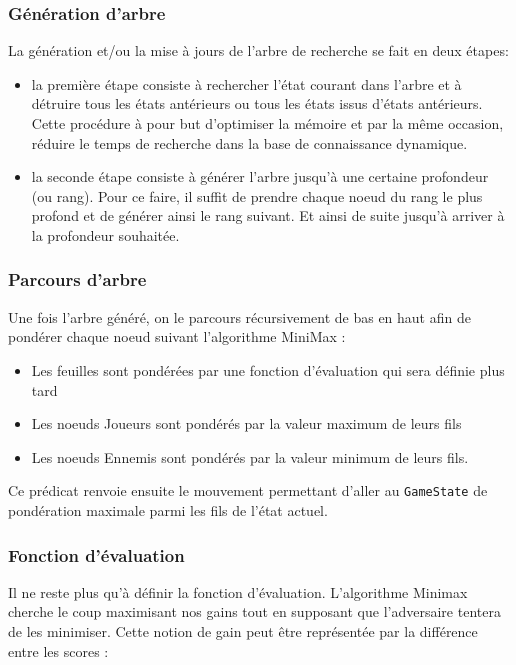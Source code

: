 \documentclass[]{article}
\begin{document}
\subsubsection{Génération d'arbre}

La génération et/ou la mise à jours de l'arbre de recherche se fait en deux étapes:
\begin{itemize}
\item la première étape consiste à rechercher l'état courant dans l'arbre et à détruire tous les états antérieurs ou tous les états issus d'états antérieurs. Cette procédure à pour but d'optimiser la mémoire et par la même occasion, réduire le temps de recherche dans la base de connaissance dynamique.
\item la seconde étape consiste à générer l'arbre jusqu'à une certaine profondeur (ou rang). Pour ce faire, il suffit de prendre chaque noeud du rang le plus profond et de générer ainsi le rang suivant. Et ainsi de suite jusqu'à arriver à la profondeur souhaitée.
\end{itemize}

\subsubsection{Parcours d'arbre}

Une fois l'arbre généré, on le parcours récursivement de bas en haut afin de pondérer chaque noeud suivant l'algorithme MiniMax :
\begin{itemize}
\item Les feuilles sont pondérées par une fonction d'évaluation qui sera définie plus tard
\item Les noeuds Joueurs sont pondérés par la valeur maximum de leurs fils
\item Les noeuds Ennemis sont pondérés par la valeur minimum de leurs fils.
\end{itemize}

Ce prédicat renvoie ensuite le mouvement permettant d'aller au \texttt{GameState} de pondération maximale parmi les fils de l'état actuel.

\subsubsection{Fonction d'évaluation}

Il ne reste plus qu'à définir la fonction d'évaluation. L'algorithme Minimax cherche le coup maximisant nos gains tout en supposant que l'adversaire tentera de les minimiser. Cette notion de gain peut être représentée par la différence entre les scores : 
\end{document}
